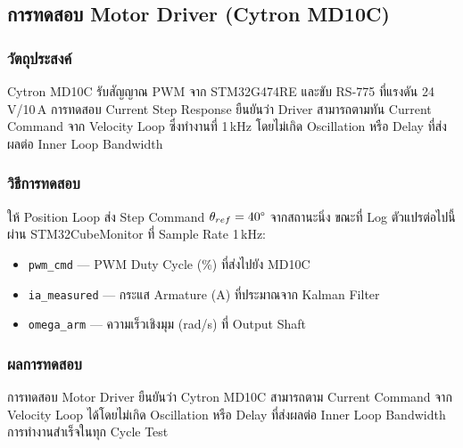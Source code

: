 \subsection{การทดสอบ Motor Driver (Cytron MD10C)}
\label{subsec:motor_driver_test}

\subsubsection{วัตถุประสงค์}

Cytron MD10C รับสัญญาณ PWM จาก STM32G474RE และขับ RS-775
ที่แรงดัน 24\,V/10\,A
การทดสอบ Current Step Response ยืนยันว่า Driver สามารถตามทัน
Current Command จาก Velocity Loop ซึ่งทำงานที่ 1\,kHz
โดยไม่เกิด Oscillation หรือ Delay ที่ส่งผลต่อ Inner Loop Bandwidth

\subsubsection{วิธีการทดสอบ}

ให้ Position Loop ส่ง Step Command $\theta_{ref} = 40\degree$ จากสถานะนิ่ง
ขณะที่ Log ตัวแปรต่อไปนี้ผ่าน STM32CubeMonitor ที่ Sample Rate 1\,kHz:

\begin{itemize}
    \item \texttt{pwm\_cmd} — PWM Duty Cycle (\%) ที่ส่งไปยัง MD10C
    \item \texttt{ia\_measured} — กระแส Armature (A) ที่ประมาณจาก Kalman Filter
    \item \texttt{omega\_arm} — ความเร็วเชิงมุม (rad/s) ที่ Output Shaft
\end{itemize}

\subsubsection{ผลการทดสอบ}

\noindent การทดสอบ Motor Driver ยืนยันว่า Cytron MD10C สามารถตาม Current Command
จาก Velocity Loop ได้โดยไม่เกิด Oscillation หรือ Delay ที่ส่งผลต่อ Inner Loop Bandwidth
การทำงานสำเร็จในทุก Cycle Test


